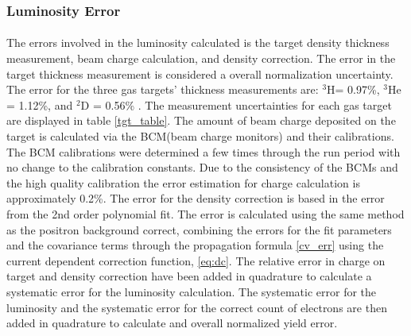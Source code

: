 \subsubsection{Luminosity Error}
\paragraph{}The errors involved in the luminosity calculated is the target density thickness measurement, beam charge calculation, and density correction. The error in the target thickness measurement is considered a overall normalization uncertainty. The error for the three gas targets' thickness measurements are: $^3$H= 0.97\%, $^3$He = 1.12\%, and $^2$D = 0.56\% \cite{HATT_eng}. The measurement uncertainties for each gas target are displayed in table \ref{tgt_table}. The amount of beam charge deposited on the target is calculated via the BCM(beam charge monitors) and their calibrations. The BCM calibrations were determined a few times through the run period with no change to the calibration constants. Due to the consistency of the BCMs and the high quality calibration the  error estimation for charge calculation is approximately 0.2\%. The error for the density correction is based in the error from the 2nd order polynomial fit. The error is calculated using the same method as the positron background correct, combining the errors for the fit parameters and the covariance terms through the propagation formula \ref{cv_err} using the current dependent correction function, \ref{eq:dc}. The relative error in charge on target and density correction have been added in quadrature to calculate a systematic error for the luminosity calculation. The systematic error for the luminosity and the systematic error for the correct count of electrons are then added in quadrature to calculate and overall normalized yield error.  
